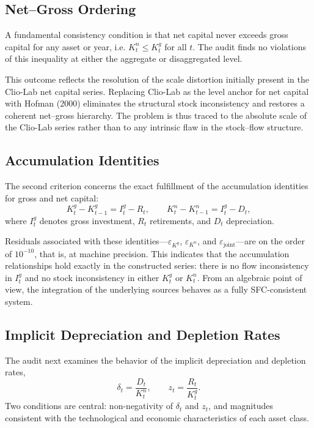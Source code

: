 \subsection{Net--Gross Ordering}

A fundamental consistency condition is that net capital never exceeds gross capital for any asset or year, i.e. \(K^n_t \leq K^g_t\) for all \(t\). The audit finds no violations of this inequality at either the aggregate or disaggregated level.

This outcome reflects the resolution of the scale distortion initially present in the Clio-Lab net capital series. Replacing Clio-Lab as the level anchor for net capital with Hofman (2000) eliminates the structural stock inconsistency and restores a coherent net--gross hierarchy. The problem is thus traced to the absolute scale of the Clio-Lab series rather than to any intrinsic flaw in the stock--flow structure.

\subsection{Accumulation Identities}

The second criterion concerns the exact fulfillment of the accumulation identities for gross and net capital:
\[
K^g_t - K^g_{t-1} = I^g_t - R_t, \qquad
K^n_t - K^n_{t-1} = I^g_t - D_t,
\]
where \(I^g_t\) denotes gross investment, \(R_t\) retirements, and \(D_t\) depreciation.

Residuals associated with these identities---\(\varepsilon_{K^g}\), \(\varepsilon_{K^n}\), and \(\varepsilon_{\text{joint}}\)---are on the order of \(10^{-10}\), that is, at machine precision. This indicates that the accumulation relationships hold exactly in the constructed series: there is no flow inconsistency in \(I^g_t\) and no stock inconsistency in either \(K^g_t\) or \(K^n_t\). From an algebraic point of view, the integration of the underlying sources behaves as a fully SFC-consistent system.

\subsection{Implicit Depreciation and Depletion Rates}

The audit next examines the behavior of the implicit depreciation and depletion rates,
\[
\delta_t = \frac{D_t}{K^n_t}, \qquad
z_t = \frac{R_t}{K^g_t}.
\]
Two conditions are central: non-negativity of \(\delta_t\) and \(z_t\), and magnitudes consistent with the technological and economic characteristics of each asset class.


